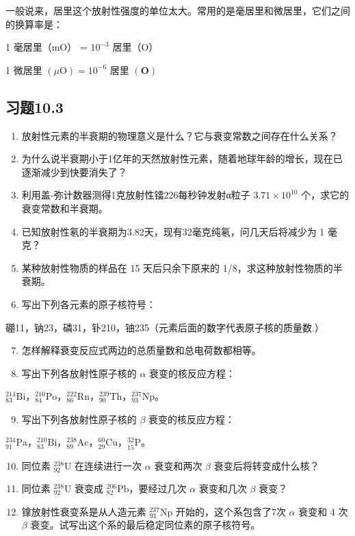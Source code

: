 一般说来，居里这个放射性强度的单位太大。常用的是毫居里和微居里，它们之间的换算率是：

1 毫居里（mO） = \(10^{-3}\) 居里（O）

1 微居里 \((\mu \mathrm{O}) = 10^{-6}\) 居里 \((\mathbf{O})\)

\subsection{习题10.3}

\begin{enumerate}
\item
  放射性元素的半衰期的物理意义是什么？它与衰变常数之间存在什么关系？
\item
  为什么说半衰期小于1亿年的天然放射性元素，随着地球年龄的增长，现在已逐渐减少到快要消失了？
\item
  利用盖-弥计数器测得1克放射性镭226每秒钟发射α粒子 \(3.71\times10^{10}\)
  个，求它的衰变常数和半衰期。
\item
  已知放射性氡的半衰期为3.82天，现有32毫克纯氡，问几天后将减少为 1
  毫克？
\item
  某种放射性物质的样品在 15 天后只余下原来的
  1/8，求这种放射性物质的半衰期。
\item
  写出下列各元素的原子核符号：
\end{enumerate}

硼11，钠23，磷31，钋210，铀235（元素后面的数字代表原子核的质量数.）

\begin{enumerate}
\setcounter{enumi}{6}
\item
  怎样解释衰变反应式两边的总质量数和总电荷数都相等。
\item
  写出下列各放射性原子核的 \(\alpha\) 衰变的核反应方程：
\end{enumerate}

\({}^{214}_{83}\mathrm{Bi}\)，\({}^{210}_{84}\mathrm{Po}\)，\({}^{222}_{86}\mathrm{Rn}\)，\({}^{239}_{90}\mathrm{Th}\)，\({}^{237}_{93}\mathrm{Np}\)。

\begin{enumerate}
\setcounter{enumi}{8}
\item
  写出下列各放射性原子核的 \(\beta\) 衰变的核反应方程：
\end{enumerate}

\({}^{234}_{91}\mathrm{Pa}\)，\({}^{210}_{83}\mathrm{Bi}\)，\({}^{238}_{89}\mathrm{Ac}\)，\({}^{60}_{29}\mathrm{Cu}\)，\({}^{32}_{15}\mathrm{P}\)。

\begin{enumerate}
\setcounter{enumi}{9}
\item
  同位素 \(^{238}_{92}\mathrm{U}\) 在连续进行一次 \(\alpha\) 衰变和两次
  \(\beta\) 衰变后将转变成什么核？
\item
  同位素 \(^{238}_{92}\mathrm{U}\) 衰变成
  \(^{206}_{82}\mathrm{Pb}\)，要经过几次 \(\alpha\) 衰变和几次 \(\beta\)
  衰变？
\item
  镎放射性衰变系是从人造元素 \(^{237}_{93}\mathrm{Np}\)
  开始的，这个系包含了7次 \(\alpha\) 衰变和 4 次 \(\beta\)
  衰变。试写出这个系的最后稳定同位素的原子核符号。
\end{enumerate}

